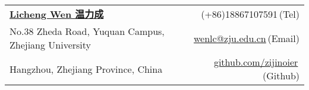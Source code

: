 \newcommand{\paint}[3]{
    \begin{minipage}{#1}
        \texttt{[image: \#3]}
    \end{minipage}
}
\newcommand{\myheader}{
    \begin{tabular*}{\textwidth}{l@{\extracolsep{\fill}}r}
        \specialrule{0em}{4pt}{4pt}
        \textbf{\href{http://wenlc.cn/cv}{\LARGE Licheng Wen 温力成}} & (+86)18867107591$\,${\color{labelgrey}(Tel)}\\
        No.38 Zheda Road, Yuquan Campus, Zhejiang University$\,$ &\href{mailto:wenlc@zju.edu.cn}{wenlc@zju.edu.cn}$\,${\color{labelgrey}(Email)} \\
        Hangzhou, Zhejiang Province, China$\,$& \href{https://github.com/zijinoier}{github.com/zijinoier}$\,${\color{labelgrey}(Github)} \\
    \end{tabular*}\\

}

\myheader


